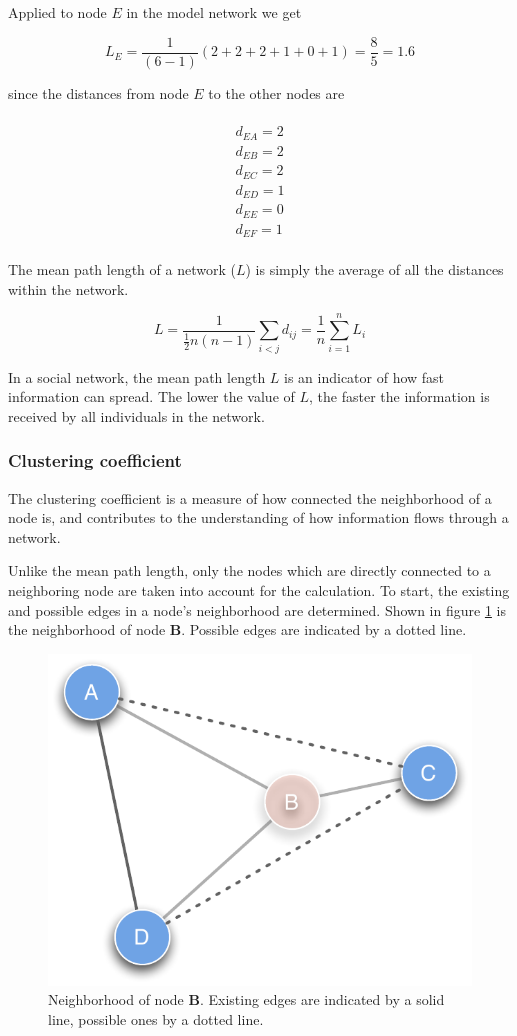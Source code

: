Applied to node $E$ in the model network we get

\begin{equation}
L_E = \frac{1}{(6-1)}(2 + 2 + 2 + 1 + 0 + 1) = \frac{8}{5} = 1.6
\label{eq:average_path_lenght_e}
\end{equation}

since the distances from node $E$ to the other nodes are

\begin{multline} 
\\d_{EA} = 2 \\
d_{EB} = 2 \\
d_{EC} = 2 \\
d_{ED} = 1 \\
d_{EE} = 0 \\
d_{EF} = 1 \\
\label{eq:distances_e}
\end{multline}

The mean path length of a network ($L$) is simply the average of all the distances within the network.

\begin{equation}
L = \frac{1}{ \frac{1}{2}n(n-1)}\sum_{i<j} d_{ij} = \frac{1}{n}\sum^n_{i=1}L_i
\label{eq:mean_path_lenght}
\end{equation} 

In a social network, the mean path length $L$ is an indicator of how fast information can spread. The lower the value of $L$, the faster the information is received by all individuals in the network. 

\subsubsection{Clustering coefficient}

The clustering coefficient is a measure of how connected the neighborhood of a node is, and contributes to the understanding of how information flows through a network.

Unlike the mean path length, only the nodes which are directly connected to a neighboring node are taken into account for the calculation. To start, the existing and possible edges in a node's neighborhood are determined. Shown in figure \ref{fig:clust_coeff} is the neighborhood of node \textbf{B}. Possible edges are indicated by a dotted line.

\begin{figure}[htpb]
\begin{center}
  \includegraphics[width=.33\textwidth]{assets/pdf/clustering_coefficient.pdf}
  \caption[Neighborhood of node \textit{B}]{Neighborhood of node \textbf{B}. Existing edges are indicated by a solid line, possible ones by a dotted line.}
  \label{fig:clust_coeff}
\end{center}
\end{figure}

